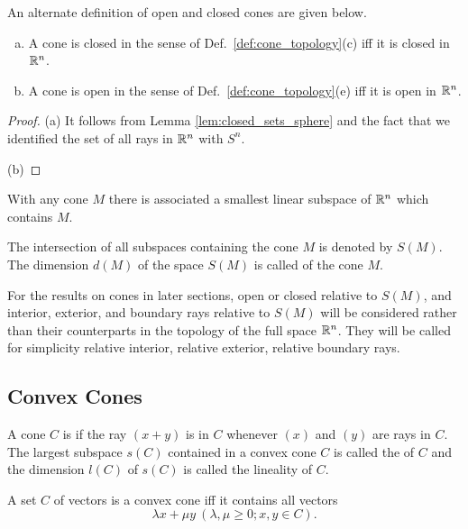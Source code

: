 \documentclass[11pt,a4paper]{article}
\begin{document}
\begin{proposition}
    An alternate definition of open and closed cones are given below.
    \begin{enumerate}[(a)]
        \item A cone is {closed} in the sense of Def.~\ref{def:cone_topology}(c) iff it is closed in $\mathbb{R}^n$.
        \item A cone is {open} in the sense of Def.~\ref{def:cone_topology}(e) iff it is open in $\mathbb{R}^n$.
    \end{enumerate}
\end{proposition}

\begin{proof}
    (a) It follows from Lemma \ref{lem:closed_sets_sphere} and the fact that we identified the set of all rays in $\mathbb{R}^n$ with $S^n$. 

    (b)
\end{proof}

With any cone $M$ there is associated a smallest linear subspace of $\mathbb{R}^n$ which contains $M$.

\begin{definition}
    The intersection of all subspaces containing the cone $M$ is denoted by $S(M)$. The dimension $d(M)$ of the space $S(M)$ is called  of the cone $M$.
\end{definition}

For the results on cones in later sections, open or closed relative to $S(M)$, and interior, exterior, and boundary rays relative to $S(M)$ will be considered rather than their counterparts in the topology of the full space $\mathbb{R}^n$. They will be called for simplicity relative interior, relative exterior, relative boundary rays.

\subsection*{Convex Cones}

\begin{definition}
    A cone $C$ is  if the ray $(x+y)$ is in $C$ whenever $(x)$ and $(y)$ are rays in $C$. The largest subspace $s(C)$ contained in a convex cone $C$ is called the  of $C$ and the dimension $l(C)$ of $s(C)$ is called the lineality of $C$.
\end{definition}

\begin{remark}
    A set $C$ of vectors is a convex cone iff it contains all vectors
    \begin{equation*}
    \lambda x + \mu y\ (\lambda, \mu \ge 0; x,y\in C).
    \end{equation*}
\end{remark}
\end{document}
